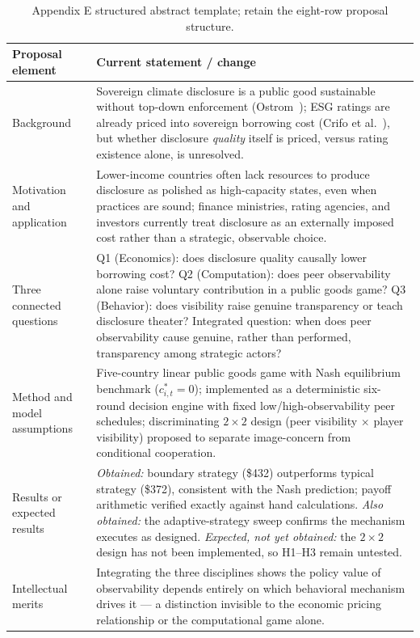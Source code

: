 \begin{table}[H]
\caption{Appendix E structured abstract template; retain the eight-row proposal structure.}
\label{tab:abstract-map}
\renewcommand{\arraystretch}{1.18}
\begin{tabularx}{\textwidth}{@{}p{}Y@{}}
\toprule
\textbf{Proposal element} & \textbf{Current statement / change} \\
\midrule
Background&Sovereign climate disclosure is a public good sustainable without top-down enforcement (Ostrom~\cite{ostrom1990}); ESG ratings are already priced into sovereign borrowing cost (Crifo et al.~\cite{crifo2017}), but whether disclosure \emph{quality} itself is priced, versus rating existence alone, is unresolved.\\
Motivation and application&Lower-income countries often lack resources to produce disclosure as polished as high-capacity states, even when practices are sound; finance ministries, rating agencies, and investors currently treat disclosure as an externally imposed cost rather than a strategic, observable choice.\\
Three connected questions&Q1 (Economics): does disclosure quality causally lower borrowing cost? Q2 (Computation): does peer observability alone raise voluntary contribution in a public goods game? Q3 (Behavior): does visibility raise genuine transparency or teach disclosure theater? Integrated question: when does peer observability cause genuine, rather than performed, transparency among strategic actors?\\
Method and model assumptions&Five-country linear public goods game with Nash equilibrium benchmark ($c_{i,t}^{*}=0$); implemented as a deterministic six-round decision engine with fixed low/high-observability peer schedules; discriminating $2\times2$ design (peer visibility $\times$ player visibility) proposed to separate image-concern from conditional cooperation.\\
Results or expected results&\emph{Obtained:} boundary strategy (\$432) outperforms typical strategy (\$372), consistent with the Nash prediction; payoff arithmetic verified exactly against hand calculations. \emph{Also obtained:} the adaptive-strategy sweep confirms the mechanism executes as designed. \emph{Expected, not yet obtained:} the $2\times2$ design has not been implemented, so H1--H3 remain untested.\\
Intellectual merits&Integrating the three disciplines shows the policy value of observability depends entirely on which behavioral mechanism drives it --- a distinction invisible to the economic pricing relationship or the computational game alone.\\

\end{tabularx}
\end{table}
